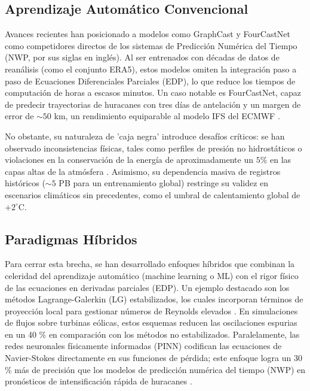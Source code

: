 \subsection{Aprendizaje Automático Convencional}

Avances recientes han posicionado a modelos como GraphCast \citep{lam2023graphcast} y FourCastNet \citep{pathak2022fourcastnet} como competidores directos de los sistemas de Predicción Numérica del Tiempo (NWP, por sus siglas en inglés). Al ser entrenados con décadas de datos de reanálisis (como el conjunto ERA5), estos modelos omiten la integración paso a paso de Ecuaciones Diferenciales Parciales (EDP), lo que reduce los tiempos de computación de horas a escasos minutos. Un caso notable es FourCastNet, capaz de predecir trayectorias de huracanes con tres días de antelación y un margen de error de $\sim 50$ km, un rendimiento equiparable al modelo IFS del ECMWF \citep{pathak2022fourcastnet}.

No obstante, su naturaleza de 'caja negra' introduce desafíos críticos: se han observado inconsistencias físicas, tales como perfiles de presión no hidrostáticos o violaciones en la conservación de la energía de aproximadamente un $5\%$ en las capas altas de la atmósfera \citep{pathak2022fourcastnet}. Asimismo, su dependencia masiva de registros históricos ($\sim 5$ PB para un entrenamiento global) restringe su validez en escenarios climáticos sin precedentes, como el umbral de calentamiento global de $+2^\circ$C.

\subsection{Paradigmas Híbridos}

Para cerrar esta brecha, se han desarrollado enfoques híbridos que combinan la celeridad del aprendizaje automático (machine learning o ML) con el rigor físico de las ecuaciones en derivadas parciales (EDP). Un ejemplo destacado son los métodos Lagrange-Galerkin (LG) estabilizados, los cuales incorporan términos de proyección local para gestionar números de Reynolds elevados \citep{bermejo2016lagrange}. En simulaciones de flujos sobre turbinas eólicas, estos esquemas reducen las oscilaciones espurias en un 40 \% en comparación con los métodos no estabilizados. Paralelamente, las redes neuronales físicamente informadas (PINN) codifican las ecuaciones de Navier-Stokes directamente en sus funciones de pérdida; este enfoque logra un 30 \% más de precisión que los modelos de predicción numérica del tiempo (NWP) en pronósticos de intensificación rápida de huracanes \citep{yang2023physics}.